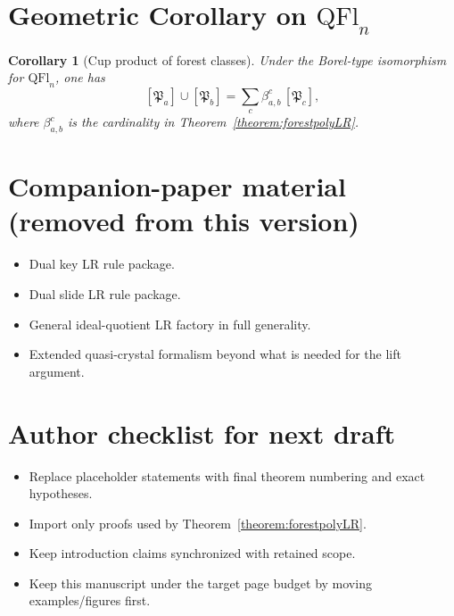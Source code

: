 \documentclass{amsart}
\newtheorem{corollary}[theorem]{Corollary}
\theoremstyle{definition}
\theoremstyle{remark}
\newcommand{\forest}{\mathfrak{P}}
\begin{document}
\section{Geometric Corollary on $\mathrm{QFl}_n$}

\begin{corollary}[Cup product of forest classes]
Under the Borel-type isomorphism for $\mathrm{QFl}_n$, one has
\[
[\forest_a]\cup[\forest_b]=\sum_c \beta_{a,b}^c\,[\forest_c],
\]
where $\beta_{a,b}^c$ is the cardinality in Theorem~\ref{theorem:forestpolyLR}.
\end{corollary}

\section*{Companion-paper material (removed from this version)}
\begin{itemize}
\item Dual key LR rule package.
\item Dual slide LR rule package.
\item General ideal-quotient LR factory in full generality.
\item Extended quasi-crystal formalism beyond what is needed for the lift argument.
\end{itemize}

\section*{Author checklist for next draft}
\begin{itemize}
\item Replace placeholder statements with final theorem numbering and exact hypotheses.
\item Import only proofs used by Theorem~\ref{theorem:forestpolyLR}.
\item Keep introduction claims synchronized with retained scope.
\item Keep this manuscript under the target page budget by moving examples/figures first.
\end{itemize}



\end{document}
